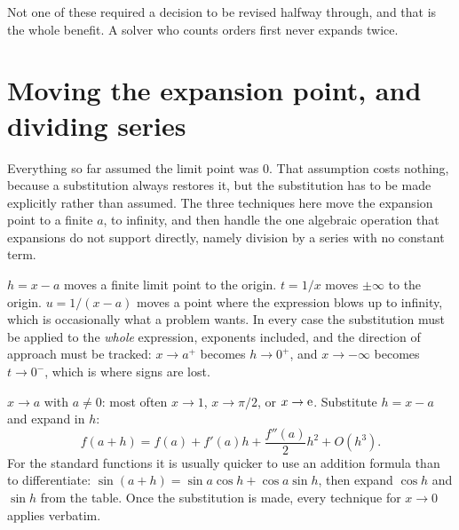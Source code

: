 Not one of these required a decision to be revised halfway through, and that is the whole benefit. A solver who counts orders first never expands twice.

\section{Moving the expansion point, and dividing series}

Everything so far assumed the limit point was $0$. That assumption costs nothing, because a substitution always restores it, but the substitution has to be made explicitly rather than assumed. The three techniques here move the expansion point to a finite $a$, to infinity, and then handle the one algebraic operation that expansions do not support directly, namely division by a series with no constant term.

\begin{keynote}
$h=x-a$ moves a finite limit point to the origin. $t=1/x$ moves $\pm\infty$ to the origin. $u=1/(x-a)$ moves a point where the expression blows up to infinity, which is occasionally what a problem wants. In every case the substitution must be applied to the \emph{whole} expression, exponents included, and the direction of approach must be tracked: $x\to a^{+}$ becomes $h\to0^{+}$, and $x\to-\infty$ becomes $t\to0^{-}$, which is where signs are lost.
\end{keynote}

\cue $x\to a$ with $a\neq0$: most often $x\to1$, $x\to\pi/2$, or $x\to\mathrm{e}$.
\method Substitute $h=x-a$ and expand in $h$:
\[
f(a+h)=f(a)+f'(a)h+\frac{f''(a)}{2}h^{2}+O(h^{3}).
\]
For the standard functions it is usually quicker to use an addition formula than to differentiate: $\sin(a+h)=\sin a\cos h+\cos a\sin h$, then expand $\cos h$ and $\sin h$ from the table. Once the substitution is made, every technique for $x\to0$ applies verbatim.

